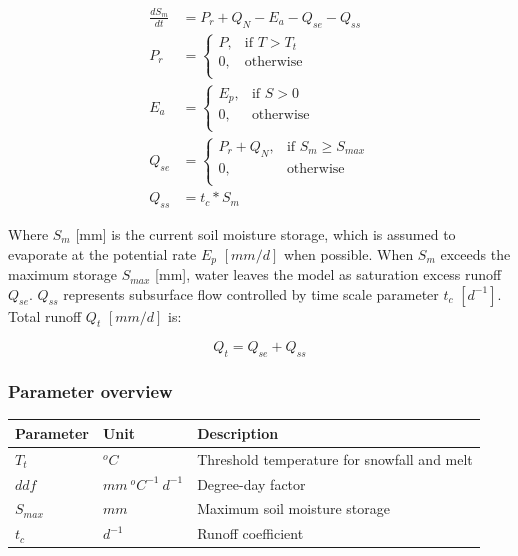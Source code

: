 \begin{align}
	\frac{dS_m}{dt} &= P_r + Q_N - E_a  - Q_{se} - Q_{ss}\\
	P_r &= \begin{cases}
		P, &\text{if } T > T_t \\
		0, & \text{otherwise} \\
	\end{cases} \\
	E_a &= \begin{cases}
		E_p, &\text{if } S > 0 \\
		0, &\text{otherwise} \\
	\end{cases} \\
	Q_{se} &= \begin{cases}
		P_r + Q_N, &\text{if } S_m \geq S_{max}\\
		0, &\text{otherwise}\\
	\end{cases}\\
	Q_{ss} &= t_c*S_m	
\end{align}

Where $S_m$ [mm] is the current soil moisture storage, which is assumed to evaporate at the potential rate $E_p$ $[mm/d]$ when possible. When $S_m$ exceeds the maximum storage $S_{max}$ [mm], water leaves the model as saturation excess runoff $Q_{se}$. $Q_{ss}$ represents subsurface flow controlled by time scale parameter $t_c$ $[d^{-1}]$. Total runoff $Q_t$ $[mm/d]$ is:

\begin{equation}
	Q_t = Q_{se} + Q_{ss}
\end{equation}

\subsubsection{Parameter overview}
\begin{table}[htbp]
  \centering
    \begin{tabular}{lll}
    \toprule
    Parameter & Unit  & Description \\
    \midrule
    $T_t$ & $^oC$ & Threshold temperature for snowfall and melt \\
    $ddf$ & $mm~^oC^{-1}~d^{-1}$ & Degree-day factor \\
    $S_{max}$ & $mm$  & Maximum soil moisture storage \\
    $t_c$ & $d^{-1}$ & Runoff coefficient \\
    \bottomrule
    \end{tabular}%
  \label{tab:addlabel}%
\end{table}%

